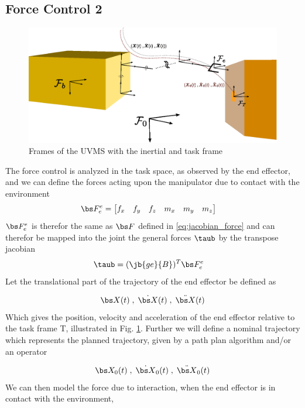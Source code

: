 \subsection{Force Control 2}
\begin{figure}[h!]
	\centering
	\includegraphics[scale=0.7]{./figures/uvms_kinematics_force.eps}
	\caption{Frames of the UVMS with the inertial and task frame}
	\label{fig:uvms_force}
\end{figure}
The force control is analyzed in the task space, as observed by the end effector, and we can define the forces acting upon the manipulator due to contact with the environment 
\begin{align}
	\bs F_e^e&=\begin{bmatrix} f_x & f_y & f_z & m_x & m_y & m_z \end{bmatrix}
	\label{eq:force_force}
\end{align}
$\bs F_e^e$ is therefor the same as $\bs F$ defined in \eqref{eq:jacobian_force} and can therefor be mapped into the joint the general forces $\taub$ by the transpose jacobian
\begin{align}
	\taub&=(\jb{ge}{B})^T\bs F_e^e
	\label{eq:jacobian-force2}
\end{align}
Let the translational part of the trajectory of the end effector be defined as

\begin{align}
	\bs X(t) \; , \; \dot{\bs X}(t)\; , \; \ddot{\bs X}(t)	
	\label{eq:ee_traj}
\end{align}
Which gives the position, velocity and acceleration of the end effector relative to the task frame \frame T, illustrated in Fig. \ref{fig:uvms_force}. Further we will define a nominal trajectory which represents the planned trajectory, given by a path plan algorithm and/or an operator

\begin{align}
	\bs X_0(t) \; , \; \dot{\bs X}_0(t)\; , \; \ddot{\bs X}_0(t)	
	\label{eq:nominal_force}
\end{align}
We can then model the force due to interaction, when the end effector is in contact with the environment, \cite{impedance_stability}

